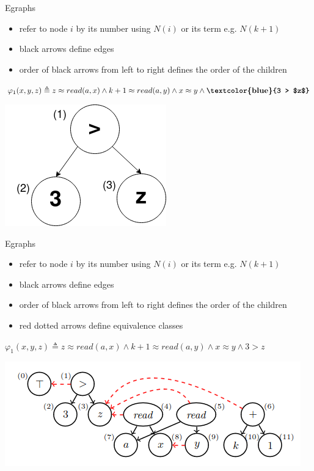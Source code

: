 \documentclass{beamer}
\begin{document}
\begin{frame}{Egraphs}

\begin{itemize}
    \item refer to node $i$ by its number using $N(i)$ or its term e.g. $N(k+1)$
    \item black arrows define edges
    \item order of black arrows from left to right defines the order of the children
    
\end{itemize}
\pause

$\varphi_1 (x,y,z) \triangleq z \approx read(a,x) \land k + 1 \approx read(a,y) \land x \approx y \land \textbf{\textcolor{blue}{3 > $z$}}$

\begin{center}
\includegraphics[scale=0.4]{FMI2.png}
\end{center}

\end{frame}



\begin{frame}{Egraphs}

\begin{itemize}
    \item refer to node $i$ by its number using $N(i)$ or its term e.g. $N(k+1)$
    \item black arrows define edges
    \item order of black arrows from left to right defines the order of the children
    \item red dotted arrows define equivalence classes
    
\end{itemize}
\pause

$\varphi_1 (x,y,z) \triangleq z \approx read(a,x) \land k + 1 \approx read(a,y) \land x \approx y \land 3 > z$

\begin{center}
\includegraphics[scale=0.5]{FMI1.png}
\end{center}

\end{frame}
\end{document}

